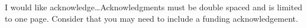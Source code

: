 
I would like acknowledge\dots Acknowledgments must be double spaced and is limited to one page. Consider that you may need to include a funding acknowledgement.

